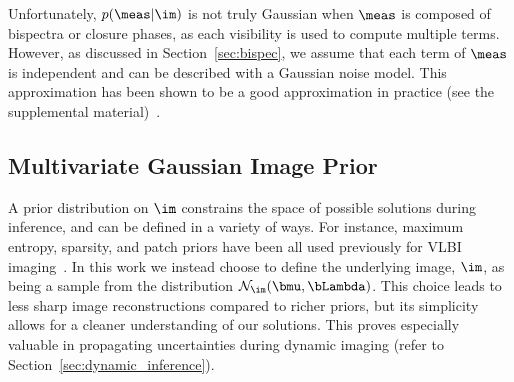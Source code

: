Unfortunately, $p(\meas|\im)$ is not truly Gaussian when $\meas$ is composed of bispectra or closure phases, as each visibility is used to compute multiple terms. However, as discussed in Section~\ref{sec:bispec}, we assume that each term of $\meas$ is independent and can be described with a Gaussian noise model. This approximation has been shown to be a good approximation in practice (see the supplemental material)~\cite{TMS,bouman2016computational}.








\vspace{-.2in}
\subsection{Multivariate Gaussian Image Prior}
\label{sec:gauss_prior}

A prior distribution on $\im$ constrains the space of possible solutions during inference, and can be defined in a variety of ways.
For instance, maximum entropy, sparsity, and patch priors have been all used previously for VLBI imaging~\cite{andrew,kazu,bouman2016computational, rusenimaging}.
In this work we instead choose to define the underlying image, $\im$, as being a sample from the distribution $\mathcal{N}_{\im}(\bmu, \bLambda)$. This choice leads to less sharp image reconstructions compared to richer priors, %
but its simplicity allows for a cleaner understanding of our solutions. This proves especially valuable in propagating uncertainties during dynamic imaging (refer to Section~\ref{sec:dynamic_inference}). 

